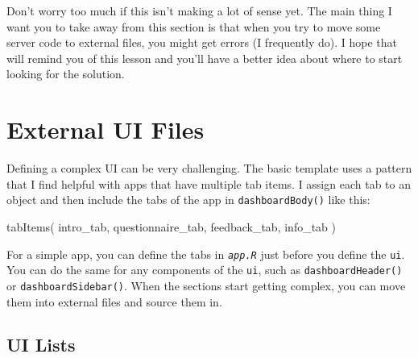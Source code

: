 \documentclass[
  oneside]{book}
\newenvironment{Shaded}{\begin{snugshade}}{\end{snugshade}}
\newcommand{\FunctionTok}[1]{\textcolor[rgb]{0.00,0.00,0.00}{#1}}
\newcommand{\NormalTok}[1]{#1}
\begin{document}
Don't worry too much if this isn't making a lot of sense yet. The main thing I want you to take away from this section is that when you try to move some server code to external files, you might get errors (I frequently do). I hope that will remind you of this lesson and you'll have a better idea about where to start looking for the solution.

\hypertarget{external-ui-files}{%
\section{External UI Files}\label{external-ui-files}}

Defining a complex UI can be very challenging. The basic template uses a pattern that I find helpful with apps that have multiple tab items. I assign each tab to an object and then include the tabs of the app in \texttt{dashboardBody}\texttt{()} like this:

\begin{Shaded}
\begin{Highlighting}[]
\FunctionTok{tabItems}\NormalTok{(}
\NormalTok{    intro\_tab,}
\NormalTok{    questionnaire\_tab,}
\NormalTok{    feedback\_tab,}
\NormalTok{    info\_tab}
\NormalTok{)}
\end{Highlighting}
\end{Shaded}

For a simple app, you can define the tabs in \textit{\texttt{app.R}} just before you define the \texttt{ui}. You can do the same for any components of the \texttt{ui}, such as \texttt{dashboardHeader}\texttt{()} or \texttt{dashboardSidebar}\texttt{()}. When the sections start getting complex, you can move them into external files and source them in.

\hypertarget{ui-lists}{%
\subsection{UI Lists}\label{ui-lists}}
\end{document}

